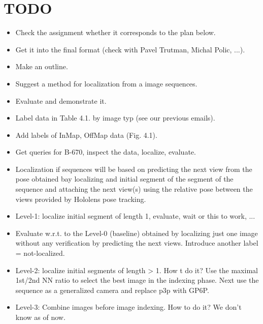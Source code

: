 \documentclass[twoside]{ctuthesis}
\theoremstyle{plain}
\theoremstyle{definition}
\theoremstyle{note}
\begin{document}
\maketitle

\chapter{TODO}

\begin{itemize}
    \item Check the assignment whether it corresponds to the plan below.
    \item Get it into the final format (check with Pavel Trutman, Michal Polic, ...).
    \item Make an outline.
    \item Suggest a method for localization from a image sequences.
    \item Evaluate and demonstrate it.
    \item Label data in Table 4.1. by image typ (see our previous emails).
    \item Add labels of InMap, OffMap data (Fig. 4.1).
    \item Get queries for B-670, inspect the data, localize, evaluate.
    \item Localization if sequences will be based on predicting the next view from the pose obtained bay localizing and initial segment of the segment of the sequence and attaching the next view(s) using the relative pose between the views provided by Hololens pose tracking. 
    \item Level-1: localize initial segment of length 1, evaluate, wait or this to work, ...
    \item Evaluate w.r.t. to the Level-0 (baseline) obtained by localizing just one image without any verification by predicting the next views. Introduce another label = not-localized.
    \item Level-2: localize initial segments of length > 1. How t do it? Use the maximal 1st/2nd NN ratio to select the best image in the indexing phase. Next use the sequence as a generalized camera and replace p3p with GP6P. 
    \item Level-3: Combine images before image indexing. How to do it? We don't know as of now.
\end{itemize}

\end{document}

